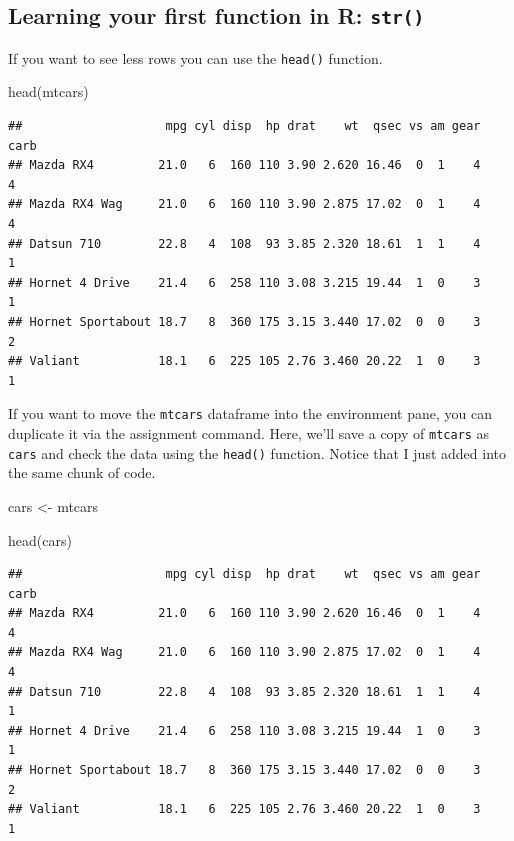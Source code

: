 \documentclass[
]{book}
\newenvironment{Shaded}{\begin{snugshade}}{\end{snugshade}}
\newcommand{\FunctionTok}[1]{\textcolor[rgb]{0.00,0.00,0.00}{#1}}
\newcommand{\NormalTok}[1]{#1}
\newcommand{\OtherTok}[1]{\textcolor[rgb]{0.56,0.35,0.01}{#1}}
\begin{document}
\hypertarget{learning-your-first-function-in-r-str}{%
\subsection{\texorpdfstring{Learning your first function in R: \texttt{str()}}{Learning your first function in R: str()}}\label{learning-your-first-function-in-r-str}}

If you want to see less rows you can use the \texttt{head()} function.

\begin{Shaded}
\begin{Highlighting}[]
\FunctionTok{head}\NormalTok{(mtcars)}
\end{Highlighting}
\end{Shaded}

\begin{verbatim}
##                    mpg cyl disp  hp drat    wt  qsec vs am gear carb
## Mazda RX4         21.0   6  160 110 3.90 2.620 16.46  0  1    4    4
## Mazda RX4 Wag     21.0   6  160 110 3.90 2.875 17.02  0  1    4    4
## Datsun 710        22.8   4  108  93 3.85 2.320 18.61  1  1    4    1
## Hornet 4 Drive    21.4   6  258 110 3.08 3.215 19.44  1  0    3    1
## Hornet Sportabout 18.7   8  360 175 3.15 3.440 17.02  0  0    3    2
## Valiant           18.1   6  225 105 2.76 3.460 20.22  1  0    3    1
\end{verbatim}

If you want to move the \texttt{mtcars} dataframe into the environment pane, you can duplicate it via the assignment command. Here, we'll save a copy of \texttt{mtcars} as \texttt{cars} and check the data using the \texttt{head()} function. Notice that I just added into the same chunk of code.

\begin{Shaded}
\begin{Highlighting}[]
\NormalTok{cars }\OtherTok{\textless{}{-}}\NormalTok{ mtcars}

\FunctionTok{head}\NormalTok{(cars)}
\end{Highlighting}
\end{Shaded}

\begin{verbatim}
##                    mpg cyl disp  hp drat    wt  qsec vs am gear carb
## Mazda RX4         21.0   6  160 110 3.90 2.620 16.46  0  1    4    4
## Mazda RX4 Wag     21.0   6  160 110 3.90 2.875 17.02  0  1    4    4
## Datsun 710        22.8   4  108  93 3.85 2.320 18.61  1  1    4    1
## Hornet 4 Drive    21.4   6  258 110 3.08 3.215 19.44  1  0    3    1
## Hornet Sportabout 18.7   8  360 175 3.15 3.440 17.02  0  0    3    2
## Valiant           18.1   6  225 105 2.76 3.460 20.22  1  0    3    1
\end{verbatim}
\end{document}
